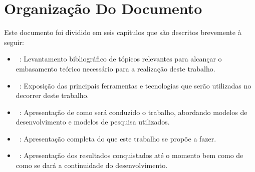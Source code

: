 \section{Organização Do Documento}

Este documento foi dividido em seis capítulos que são descritos brevemente à seguir:

\begin{itemize}
	\item ~: Levantamento bibliográfico de tópicos relevantes para alcançar o embasamento teórico necessário para a realização deste trabalho.
	\item ~: Exposição das principais ferramentas e tecnologias que serão utilizadas no decorrer deste trabalho.
	\item ~: Apresentação de como será conduzido o trabalho, abordando modelos de desenvolvimento e modelos de pesquisa utilizados.
	\item ~: Apresentação completa do que este trabalho se propõe a fazer.
	\item ~: Apresentação dos resultados conquistados até o momento bem como de como se dará a continuidade do desenvolvimento.
\end{itemize}
